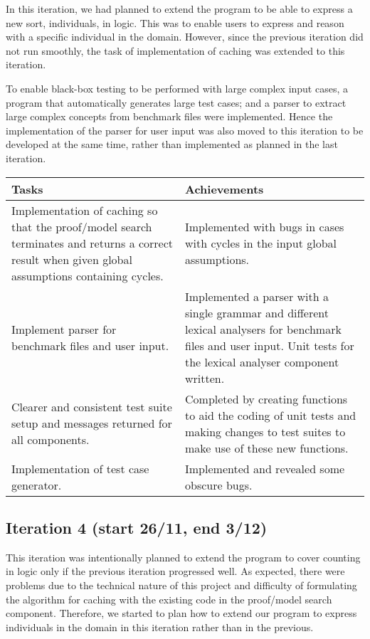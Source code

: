 In this iteration, we had planned to extend the program to be able to express a new sort, individuals, in logic. This was to enable users to express and reason with a specific individual in the domain. However, since the previous iteration did not run smoothly, the task of implementation of caching was extended to this iteration.

To enable black-box testing to be performed with large complex input cases, a program that automatically generates large test cases; and a parser to extract large complex concepts from benchmark files were implemented. Hence the implementation of the parser for user input was also moved to this iteration to be developed at the same time, rather than implemented as planned in the last iteration.

\begin{center}
\begin{longtable}{| p{7cm} | p{8cm} |}
\hline
\textbf{Tasks} & \textbf{Achievements} \\
\hline
Implementation of caching so that the proof/model search terminates and returns a correct result when given global assumptions containing cycles. & Implemented with bugs in cases with cycles in the input global assumptions.\\
\hline
Implement parser for benchmark files and user input. & Implemented a parser with a single grammar and different lexical analysers for benchmark files and user input. Unit tests for the lexical analyser component written.\\
\hline
Clearer and consistent test suite setup and messages returned for all components. & Completed by creating functions to aid the coding of unit tests and making changes to test suites to make use of these new functions.\\
\hline
Implementation of test case generator. & Implemented and revealed some obscure bugs.\\
\hline
\end{longtable}
\end{center}

\subsection*{Iteration 4 (start 26/11, end 3/12)}

This iteration was intentionally planned to extend the program to cover counting in logic only if the previous iteration progressed well. As expected, there were problems due to the technical nature of this project and difficulty of formulating the algorithm for caching with the existing code in the proof/model search component. Therefore, we started to plan how to extend our program to express individuals in the domain in this iteration rather than in the previous.

